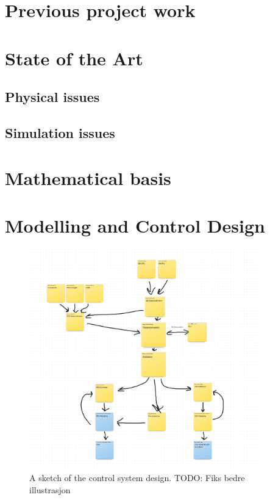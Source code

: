 \documentclass[class=article, crop=false, draft=true]{standalone}
\begin{document}
\section{Previous project work}

\section{State of the Art}
\subsection{Physical issues}
\subsection{Simulation issues}

\section{Mathematical basis}


\section{Modelling and Control Design}

\begin{figure}
    \centering
    \includegraphics[width=0.9\textwidth]{control-system}
    \caption{A sketch of the control system design. TODO: Fiks bedre illustrasjon}
    \label{fig:control-system}
\end{figure}
\end{document}
